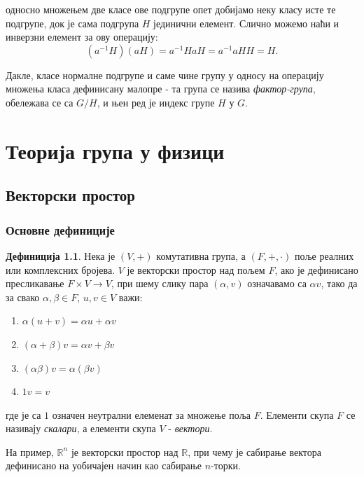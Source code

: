 \documentclass{report}
\theoremstyle{plain}
\theoremstyle{definition}
\newtheorem{defn}{Дефиниција}
\begin{document}
односно множењем две класе ове подгрупе опет добијамо неку класу исте те подгрупе, док је сама подгрупа $H$ јединични елемент. Слично можемо наћи и инверзни елемент за ову операцију:
$$(a^{-1}H)(aH) = a^{-1}HaH = a^{-1}aHH = H.$$

Дакле, класе нормалне подгрупе и саме чине групу у односу на операцију множења класа дефинисану малопре - та група се назива \emph{фактор-група}, обележава се са $G/H$, и њен ред је индекс групе $H$ у $G$.


\chapter{Теорија група у физици}
\section{Векторски простор}
\subsection{Основне дефиниције}
\begin{defn}
Нека је $(V, +)$ комутативна група, а $(F, +, \cdot)$ поље реалних или комплексних бројева. $V$ је векторски простор над пољем $F$, ако је дефинисано пресликавање $F\times V\to V$, при шему слику пара $(\alpha, v)$ означавамо са $\alpha v$, тако да за свако $\alpha, \beta \in F$, $u, v\in V$ важи:
\begin{enumerate}
\item $\alpha(u+v) = \alpha u+\alpha v$
\item $(\alpha + \beta)v = \alpha v+ \beta v$
\item $(\alpha\beta)v = \alpha(\beta v)$
\item $1v = v$
\end{enumerate}
где је са $1$ означен неутрални елеменат за множење поља $F$. Елементи скупа $F$ се називају \emph{скалари}, а елементи скупа $V$ - \emph{вектори}.
\end{defn}
На пример, $\mathbb{R}^n$ је векторски простор над $\mathbb{R}$, при чему је сабирање вектора дефинисано на уобичајен начин као сабирање $n$-торки.
\end{document}
